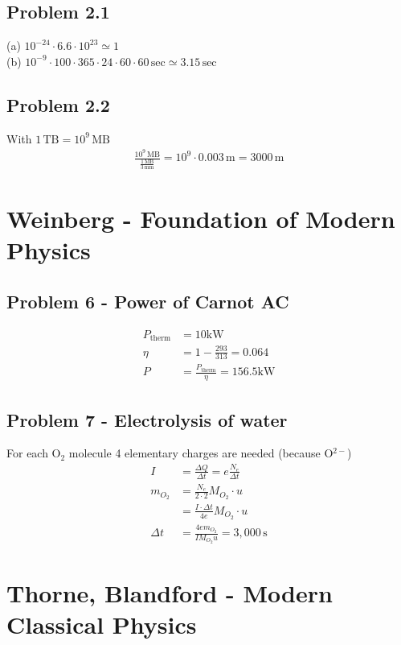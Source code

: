 \documentclass[../main.tex]{subfiles}
\begin{document}
\subsection{Problem 2.1}
(a) $10^{-24}\cdot6.6\cdot10^{23}\simeq1$\\
(b) $10^{-9}\cdot100\cdot365\cdot24\cdot60\cdot60\,\text{sec}\simeq3.15\,\text{sec}$
\subsection{Problem 2.2}
With $1\,\text{TB}=10^9\,\text{MB}$
\begin{align}
\frac{10^{9}\,\text{MB}}{\frac{1\,\text{MB}}{3\,\text{mm}}}
=10^{9}\cdot0.003\,\text{m}=3000\,\text{m}
\end{align}



\section{{\sc Weinberg} - Foundation of Modern Physics}

\subsection{Problem 6 - Power of Carnot AC}
\begin{align}
P_\text{therm}&=10\text{kW}\\
\eta&=1-\frac{293}{313}=0.064\\
P&=\frac{P_\text{therm}}{\eta}=156.5\text{kW}
\end{align}


\subsection{Problem 7 - Electrolysis of water}
For each O$_2$ molecule 4 elementary charges are needed (because O$^{2-}$)
\begin{align}
I&=\frac{\Delta Q}{\Delta t}=e\frac{N_e}{\Delta t}\\
m_{O_2}
&=\frac{N_e}{2\cdot 2}M_{O_2}\cdot u\\
&=\frac{I\cdot\Delta t}{4e}M_{O_2}\cdot u\\
\Delta t&=\frac{4em_{O_2}}{IM_{O_2}u}=3,000\,\text{s}
\end{align}





\section{{\sc Thorne, Blandford} - Modern Classical Physics}
\end{document}
